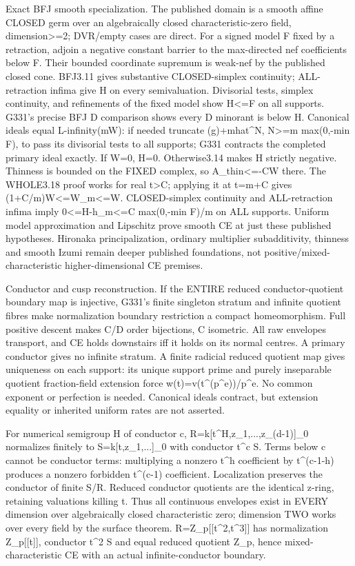 \documentclass[11pt]{article}
\begin{document}
Exact BFJ smooth specialization. The published domain is a smooth affine CLOSED germ over an algebraically closed characteristic-zero field, dimension\textgreater{}=2; DVR/empty cases are direct. For a signed model F fixed by a retraction, adjoin a negative constant barrier to the max-directed nef coefficients below F. Their bounded coordinate supremum is weak-nef by the published closed cone. BFJ3.11 gives substantive CLOSED-simplex continuity; ALL-retraction infima give H on every semivaluation. Divisorial tests, simplex continuity, and refinements of the fixed model show H\textless{}=F on all supports. G331's precise BFJ D comparison shows every D minorant is below H. Canonical ideals equal L-infinity(mW): if needed truncate (g)+mhat\textasciicircum{}N, N\textgreater{}=m max(0,-min F), to pass its divisorial tests to all supports; G331 contracts the completed primary ideal exactly. If W=0, H=0. Otherwise3.14 makes H strictly negative. Thinness is bounded on the FIXED complex, so A\_thin\textless{}=-CW there. The WHOLE3.18 proof works for real t\textgreater{}C; applying it at t=m+C gives (1+C/m)W\textless{}=W\_m\textless{}=W. CLOSED-simplex continuity and ALL-retraction infima imply 0\textless{}=H-h\_m\textless{}=C max(0,-min F)/m on ALL supports. Uniform model approximation and Lipschitz prove smooth CE at just these published hypotheses. Hironaka principalization, ordinary multiplier subadditivity, thinness and smooth Izumi remain deeper published foundations, not positive/mixed-characteristic higher-dimensional CE premises.

Conductor and cusp reconstruction. If the ENTIRE reduced conductor-quotient boundary map is injective, G331's finite singleton stratum and infinite quotient fibres make normalization boundary restriction a compact homeomorphism. Full positive descent makes C/D order bijections, C isometric. All raw envelopes transport, and CE holds downstairs iff it holds on its normal centres. A primary conductor gives no infinite stratum. A finite radicial reduced quotient map gives uniqueness on each support: its unique support prime and purely inseparable quotient fraction-field extension force w(t)=v(t\textasciicircum{}(p\textasciicircum{}e))/p\textasciicircum{}e. No common exponent or perfection is needed. Canonical ideals contract, but extension equality or inherited uniform rates are not asserted.

For numerical semigroup H of conductor c, R=k[t\textasciicircum{}H,z\_1,...,z\_(d-1)]\_0 normalizes finitely to S=k[t,z\_1,...]\_0 with conductor t\textasciicircum{}c S. Terms below c cannot be conductor terms: multiplying a nonzero t\textasciicircum{}h coefficient by t\textasciicircum{}(c-1-h) produces a nonzero forbidden t\textasciicircum{}(c-1) coefficient. Localization preserves the conductor of finite S/R. Reduced conductor quotients are the identical z-ring, retaining valuations killing t. Thus all continuous envelopes exist in EVERY dimension over algebraically closed characteristic zero; dimension TWO works over every field by the surface theorem. R=Z\_p[[t\textasciicircum{}2,t\textasciicircum{}3]] has normalization Z\_p[[t]], conductor t\textasciicircum{}2 S and equal reduced quotient Z\_p, hence mixed-characteristic CE with an actual infinite-conductor boundary.
\end{document}
